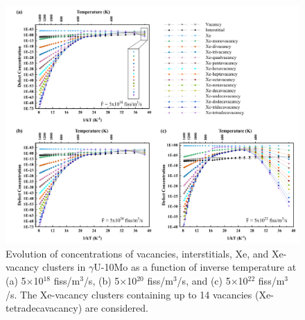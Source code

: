 \documentclass[preprint,12pt]{elsarticle}
\providecommand{\DIFaddbegin}{} %
\providecommand{\DIFaddend}{} %
\providecommand{\DIFdelbegin}{} %
\providecommand{\DIFdelend}{} %
\newcommand{\DIFscaledelfig}{0.5}
\newlength{\DIFdelgraphicswidth} %
\newlength{\DIFdelgraphicsheight} %
\newcommand{\DIFaddincludegraphics}[2][]{{\color{blue}\fbox{\DIFOincludegraphics[#1]{#2}}}} %
\newcommand{\DIFdelincludegraphics}[2][]{%
\sbox{\DIFdelgraphicsbox}{\DIFOincludegraphics[#1]{#2}}%
\settoboxwidth{\DIFdelgraphicswidth}{\DIFdelgraphicsbox} %
\settoboxtotalheight{\DIFdelgraphicsheight}{\DIFdelgraphicsbox} %
\scalebox{\DIFscaledelfig}{%
\parbox[b]{\DIFdelgraphicswidth}{\usebox{\DIFdelgraphicsbox}\\[-\baselineskip] \rule{\DIFdelgraphicswidth}{0em}}\llap{\resizebox{\DIFdelgraphicswidth}{\DIFdelgraphicsheight}{%
\setlength{\unitlength}{\DIFdelgraphicswidth}%
\begin{picture}(1,1)%
\thicklines\linethickness{2pt} %
{\color[rgb]{1,0,0}\put(0,0){\framebox(1,1){}}}%
{\color[rgb]{1,0,0}\put(0,0){\line( 1,1){1}}}%
{\color[rgb]{1,0,0}\put(0,1){\line(1,-1){1}}}%
\end{picture}%
}\hspace*{3pt}}} %
} %
\DeclareRobustCommand{\DIFaddbegin}{\DIFOaddbegin \let\includegraphics\DIFaddincludegraphics} %
\DeclareRobustCommand{\DIFaddend}{\DIFOaddend \let\includegraphics\DIFOincludegraphics} %
\DeclareRobustCommand{\DIFdelbegin}{\DIFOdelbegin \let\includegraphics\DIFdelincludegraphics} %
\DeclareRobustCommand{\DIFdelend}{\DIFOaddend \let\includegraphics\DIFOincludegraphics} %
\begin{document}
\begin{figure}[hbt!]
\centering
\includegraphics[width=1\textwidth]{A1.png}
\caption{Evolution of concentrations of vacancies, interstitials, Xe, and Xe-vacancy clusters in $\gamma$U-10Mo as a function of inverse temperature at (a) 5$\times$10$^{18}$ fiss/m$^{3}$/s, (b) 5$\times$10$^{20}$ fiss/m$^{3}$/s, and (c) 5$\times$10$^{22}$ fiss/m$^{3}$/s. The Xe-vacancy clusters containing up to 14 vacancies (Xe-tetradecavacancy) are considered.}
\label{fig:FEBE}
\end{figure}
\DIFdelbegin %

\DIFdelend \DIFaddbegin \clearpage
\DIFaddend  

\end{document}
